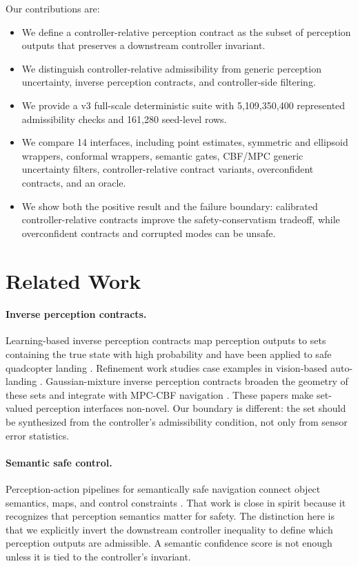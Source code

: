 \documentclass{article}
\newcommand{\fullscale}{5,109,350,400}
\newcommand{\seedrows}{161,280}
\begin{document}
Our contributions are:
\begin{itemize}
    \item We define a controller-relative perception contract as the subset of perception outputs that preserves a downstream controller invariant.
    \item We distinguish controller-relative admissibility from generic perception uncertainty, inverse perception contracts, and controller-side filtering.
    \item We provide a v3 full-scale deterministic suite with \fullscale{} represented admissibility checks and \seedrows{} seed-level rows.
    \item We compare 14 interfaces, including point estimates, symmetric and ellipsoid wrappers, conformal wrappers, semantic gates, CBF/MPC generic uncertainty filters, controller-relative contract variants, overconfident contracts, and an oracle.
    \item We show both the positive result and the failure boundary: calibrated controller-relative contracts improve the safety-conservatism tradeoff, while overconfident contracts and corrupted modes can be unsafe.
\end{itemize}

\section{Related Work}

\paragraph{Inverse perception contracts.}
Learning-based inverse perception contracts map perception outputs to sets containing the true state with high probability and have been applied to safe quadcopter landing \citep{sun2023ipc}. Refinement work studies case examples in vision-based auto-landing \citep{li2023refining}. Gaussian-mixture inverse perception contracts broaden the geometry of these sets and integrate with MPC-CBF navigation \citep{du2026gmipc}. These papers make set-valued perception interfaces non-novel. Our boundary is different: the set should be synthesized from the controller's admissibility condition, not only from sensor error statistics.

\paragraph{Semantic safe control.}
Perception-action pipelines for semantically safe navigation connect object semantics, maps, and control constraints \citep{qian2024perceptionaction}. That work is close in spirit because it recognizes that perception semantics matter for safety. The distinction here is that we explicitly invert the downstream controller inequality to define which perception outputs are admissible. A semantic confidence score is not enough unless it is tied to the controller's invariant.
\end{document}
